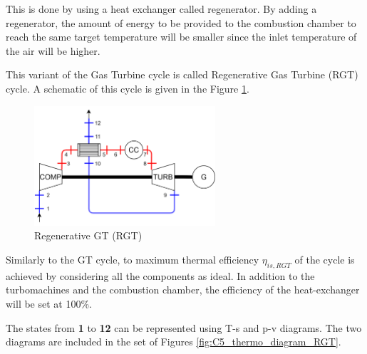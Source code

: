 This is done by using a heat exchanger called regenerator. By adding a regenerator, the amount of energy to be provided to the combustion chamber to reach the same target temperature will be smaller since the inlet temperature of the air will be higher.

This variant of the Gas Turbine cycle is called Regenerative Gas Turbine (RGT) cycle. A schematic of this cycle is given in the Figure \ref{fig:C5_RGT}.

\begin{figure}[h]
\centering
\includegraphics[width=0.6\textwidth]{RGT}
\caption{Regenerative GT (RGT)}
\label{fig:C5_RGT}
\end{figure}

Similarly to the GT cycle, to maximum thermal efficiency $\eta_{is,RGT}$ of the cycle is achieved by considering all the components as ideal. In addition to the turbomachines and the combustion chamber, the efficiency of the heat-exchanger will be set at 100\%. 

The states from \textbf{1} to \textbf{12} can be represented using T-s and p-v diagrams. The two diagrams are included in the set of Figures \ref{fig:C5_thermo_diagram_RGT}.

